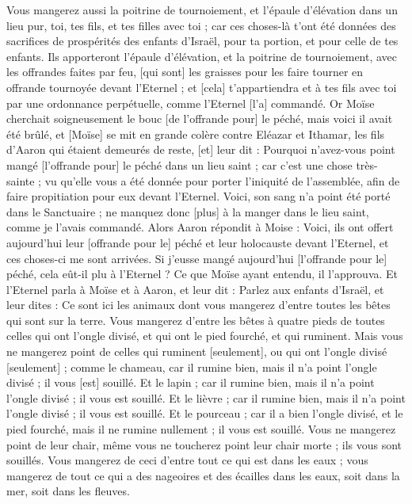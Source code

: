\begin{multicols}{2}
Vous mangerez aussi la poitrine de tournoiement, et l'épaule d'élévation dans un lieu pur, toi, tes fils, et tes filles avec toi ; car ces choses-là t'ont été données des sacrifices de prospérités des enfants d'Israël, pour ta portion, et pour celle de tes enfants.
Ils apporteront l'épaule d'élévation, et la poitrine de tournoiement, avec les offrandes faites par feu, [qui sont] les graisses pour les faire tourner en offrande tournoyée devant l'Eternel ; et [cela] t'appartiendra et à tes fils avec toi par une ordonnance perpétuelle, comme l'Eternel [l'a] commandé.
Or Moïse cherchait soigneusement le bouc [de l'offrande pour] le péché, mais voici il avait été brûlé, et [Moïse] se mit en grande colère contre Eléazar et Ithamar, les fils d'Aaron qui étaient demeurés de reste, [et] leur dit :
Pourquoi n'avez-vous point mangé [l'offrande pour] le péché dans un lieu saint ; car c'est une chose très-sainte ; vu qu'elle vous a été donnée pour porter l'iniquité de l'assemblée, afin de faire propitiation pour eux devant l'Eternel.
Voici, son sang n'a point été porté dans le Sanctuaire ; ne manquez donc [plus] à la manger dans le lieu saint, comme je l'avais commandé.
Alors Aaron répondit à Moise : Voici, ils ont offert aujourd'hui leur [offrande pour le] péché et leur holocauste devant l'Eternel, et ces choses-ci me sont arrivées. Si j'eusse mangé aujourd'hui [l'offrande pour le] péché, cela eût-il plu à l'Eternel ?
Ce que Moïse ayant entendu, il l'approuva.
\VerseOne{}Et l'Eternel parla à Moïse et à Aaron, et leur dit :
Parlez aux enfants d'Israël, et leur dites : Ce sont ici les animaux dont vous mangerez d'entre toutes les bêtes qui sont sur la terre.
Vous mangerez d'entre les bêtes à quatre pieds de toutes celles qui ont l'ongle divisé, et qui ont le pied fourché, et qui ruminent.
Mais vous ne mangerez point de celles qui ruminent [seulement], ou qui ont l'ongle divisé [seulement] ; comme le chameau, car il rumine bien, mais il n'a point l'ongle divisé ; il vous [est] souillé.
Et le lapin ; car il rumine bien, mais il n'a point l'ongle divisé ; il vous est souillé.
Et le lièvre ; car il rumine bien, mais il n'a point l'ongle divisé ; il vous est souillé.
Et le pourceau ; car il a bien l'ongle divisé, et le pied fourché, mais il ne rumine nullement ; il vous est souillé.
Vous ne mangerez point de leur chair, même vous ne toucherez point leur chair morte ; ils vous sont souillés.
Vous mangerez de ceci d'entre tout ce qui est dans les eaux ; vous mangerez de tout ce qui a des nageoires et des écailles dans les eaux, soit dans la mer, soit dans les fleuves.

\end{multicols}
